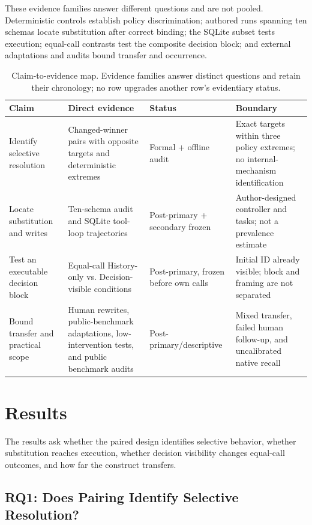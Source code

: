 \documentclass[letterpaper]{article}
\begin{document}
These evidence families answer different questions and are not pooled. Deterministic controls
establish policy discrimination; authored runs spanning ten schemas locate substitution after
correct binding; the SQLite subset tests execution; equal-call contrasts test the composite
decision block; and external adaptations and audits bound transfer and occurrence.

\begin{table}[t]
\centering
\small
\begin{tabular}{@{}p{}p{}p{}p{}@{}}
\toprule
Claim & Direct evidence & Status & Boundary \\
\midrule
Identify selective resolution & Changed-winner pairs with opposite targets and deterministic extremes & Formal + offline audit & Exact targets within three policy extremes; no internal-mechanism identification \\
Locate substitution and writes & Ten-schema audit and SQLite tool-loop trajectories & Post-primary + secondary frozen & Author-designed controller and tasks; not a prevalence estimate \\
Test an executable decision block & Equal-call History-only vs. Decision-visible conditions & Post-primary, frozen before own calls & Initial ID already visible; block and framing are not separated \\
Bound transfer and practical scope & Human rewrites, public-benchmark adaptations, low-intervention tests, and public benchmark audits & Post-primary/descriptive & Mixed transfer, failed human follow-up, and uncalibrated native recall \\
\bottomrule
\end{tabular}
\caption{Claim-to-evidence map. Evidence families answer distinct questions and retain their
chronology; no row upgrades another row's evidentiary status.}
\label{tab:claim-evidence-map}
\end{table}

\section{Results}

The results ask whether the paired design identifies selective behavior, whether substitution
reaches execution, whether decision visibility changes equal-call outcomes, and how far the
construct transfers.

\subsection{RQ1: Does Pairing Identify Selective Resolution?}
\end{document}
